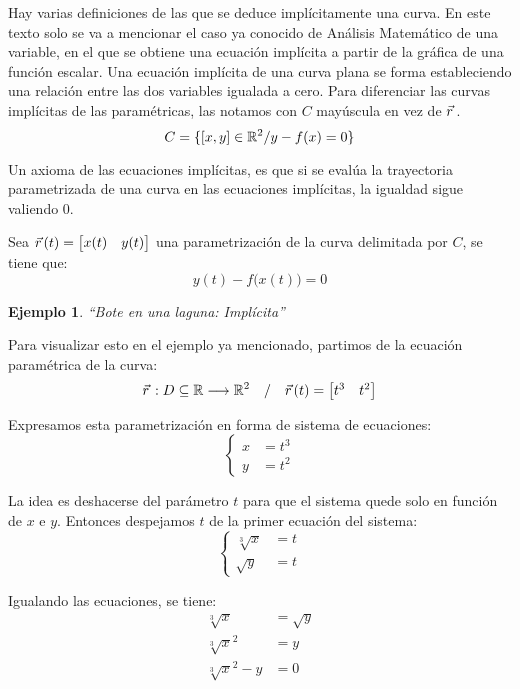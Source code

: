 \documentclass[a5paper,12pt,twoside]{book}
\newtheorem{example}{{Ejemplo}}[chapter]
\begin{document}
Hay varias definiciones de las que se deduce implícitamente una curva.
En este texto solo se va a mencionar el caso ya conocido de Análisis Matemático de una variable, en el que se obtiene una ecuación implícita a partir de la gráfica de una función escalar.
Una ecuación implícita de una curva plana se forma estableciendo una relación entre las dos variables igualada a cero.
Para diferenciar las curvas implícitas de las paramétricas, las notamos con $C$ mayúscula en vez de $\vec{r}\hspace{0.05cm}$.
\[
C = \{ [x,y] \in \mathbb{R}^2 / y-f(x)=0 \}
\]

Un axioma de las ecuaciones implícitas, es que si se evalúa la trayectoria parametrizada de una curva en las ecuaciones implícitas, la igualdad sigue valiendo 0.

Sea $\vec{r}\hspace{0.05cm}(t) = \begin{bmatrix}x(t) & y(t)\end{bmatrix}$ una parametrización de la curva delimitada por $C$, se tiene que:
\[
y(t) - f \big( x(t) \big) =0
\]

\begin{example}
  ``Bote en una laguna: Implícita''
\end{example}

Para visualizar esto en el ejemplo ya mencionado, partimos de la ecuación paramétrica de la curva:
\[
  \vec{r}\hspace{0.05cm}:D \subseteq \mathbb{R} \longrightarrow \mathbb{R}^2 \quad / \quad \vec{r}\hspace{0.05cm}(t) =
  \begin{bmatrix}
      t^3 & t^2
  \end{bmatrix}
\]

Expresamos esta parametrización en forma de sistema de ecuaciones:
\[
\left\{
  \begin{aligned}
    x &= t^3
    \\
    y &= t^2
  \end{aligned}
\right.
\]

La idea es deshacerse del parámetro $t$ para que el sistema quede solo en función de $x$ e $y$.
Entonces despejamos $t$ de la primer ecuación del sistema:
\[
  \left\{
    \begin{aligned}
      \sqrt[3]{x} &= t
      \\
      \sqrt{y} &= t
    \end{aligned}
  \right.
\]

Igualando las ecuaciones, se tiene:
\begin{align*}
  \sqrt[3]{x} &= \sqrt{y}
  \\
  \sqrt[3]{x}^2 &= y
  \\
  \sqrt[3]{x}^2 - y &= 0
\end{align*}
\end{document}

